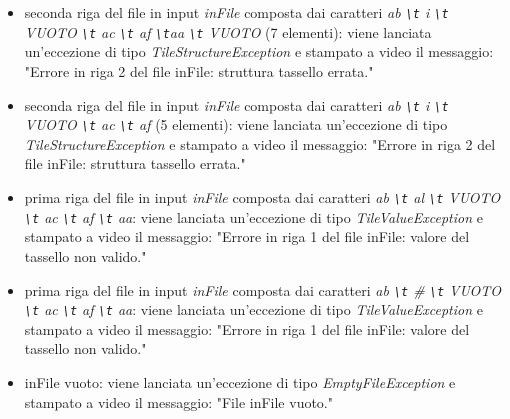 \documentclass{article}
\begin{document}
\begin{itemize}
\item seconda riga del file in input \textit{inFile} composta dai caratteri  \textit{ab \texttt{\textbackslash t} i \texttt{\textbackslash t} VUOTO \texttt{\textbackslash t} ac \texttt{\textbackslash t} af \texttt{\textbackslash t}aa \texttt{\textbackslash t} VUOTO} (7 elementi): viene lanciata un'eccezione di tipo \textit{TileStructureException} e stampato a video il messaggio: "Errore in riga 2 del file inFile: struttura tassello errata."

\item seconda riga del file in input \textit{inFile} composta dai caratteri  \textit{ab \texttt{\textbackslash t} i \texttt{\textbackslash t} VUOTO \texttt{\textbackslash t} ac \texttt{\textbackslash t} af} (5 elementi): viene lanciata un'eccezione di tipo \textit{TileStructureException} e stampato a video il messaggio: "Errore in riga 2 del file inFile: struttura tassello errata."

\item prima riga del file in input \textit{inFile} composta dai caratteri  \textit{ab \texttt{\textbackslash t} al \texttt{\textbackslash t} VUOTO \texttt{\textbackslash t} ac \texttt{\textbackslash t} af \texttt{\textbackslash t} 	aa}: viene lanciata un'eccezione di tipo \textit{TileValueException} e stampato a video il messaggio: "Errore in riga 1 del file inFile: valore del tassello non valido."

\item prima riga del file in input \textit{inFile} composta dai caratteri  \textit{ab \texttt{\textbackslash t} \# \texttt{\textbackslash t} VUOTO \texttt{\textbackslash t} ac \texttt{\textbackslash t} af \texttt{\textbackslash t} 	aa}: viene lanciata un'eccezione di tipo \textit{TileValueException} e stampato a video il messaggio: "Errore in riga 1 del file inFile: valore del tassello non valido."

\item inFile vuoto: viene lanciata un'eccezione di tipo \textit{EmptyFileException} e stampato a video il messaggio: "File inFile vuoto."
\end{itemize}
\end{document}
